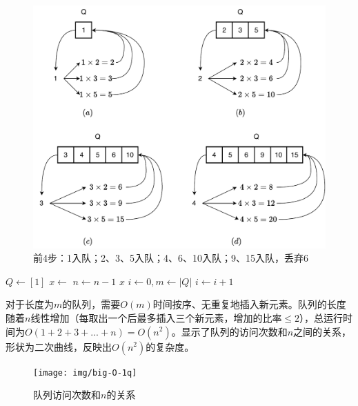 \documentclass[b5paper]{ctexart}
\begin{document}
\begin{figure}[htbp]
  \centering
  \includegraphics[scale=0.5]{img/regular-num-1q}
  \caption{前4步：1入队；2、3、5入队；4、6、10入队；9、15入队，丢弃6}
  \label{fig:queues}
\end{figure}

\begin{algorithmic}[1]
  \State $Q \gets [1]$
    \State $x \gets$ 
    \State {}
    \State {}
    \State {}
    \State $n \gets n-1$
  \EndWhile
  \State \Return $x$
\EndFunction
\Statex
{}
  \State $i \gets 0, m \gets |Q|$
    \State $i \gets i + 1$
  \EndWhile
    \State {}
  \EndIf
\EndFunction
\end{algorithmic}

对于长度为$m$的队列，需要$O(m)$时间按序、无重复地插入新元素。队列的长度随着$n$线性增加（每取出一个后最多插入三个新元素，增加的比率$\leq 2$），总运行时间为$O(1 + 2 + 3 + ... + n) = O(n^2)$。显示了队列的访问次数和$n$之间的关系，形状为二次曲线，反映出$O(n^2)$的复杂度。

\begin{figure}[htbp]
  \centering
  \texttt{[image: img/big-O-1q]}
  \caption{队列访问次数和$n$的关系}
  \label{fig:big-O-1q}
\end{figure}
\end{document}
